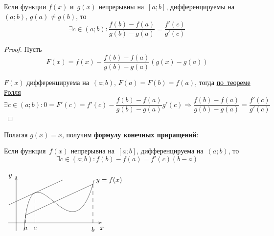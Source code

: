\begin{theorem}
\label{th:Cauchy's_mean_value}
Если функции $f(x)$ и~$g(x)$ непрерывны на~$[a; b]$, дифференцируемы на~$(a; b)$, $g(a) \neq g(b)$, то
\begin{equation*}
\exists c \in (a; b) \colon \frac{f(b) - f(a)}{g(b) - g(a)} = \frac{f'(c)}{g'(c)}
\end{equation*}
\end{theorem}
\begin{proof}
Пусть
\begin{equation*}
F(x) = f(x) - \frac{f(b) - f(a)}{g(b) - g(a)}(g(x) - g(a))
\end{equation*}

$F(x)$ дифференцируема на~$(a; b)$, $F(a) = F(b) = f(a)$, тогда \hyperref[th:Rolle's]{по~теореме Ролля}
\begin{equation*}
\exists c \in (a; b) \colon 0 = F'(c) = f'(c) - \frac{f(b) - f(a)}{g(b) - g(a)} g'(c) \Rightarrow
\frac{f(b) - f(a)}{g(b) - g(a)} = \frac{f'(c)}{g'(c)}
\end{equation*}
\end{proof}

Полагая $g(x) = x$, получим \textbf{формулу конечных приращений}:
\begin{theorem}
\label{th:mean_value}
Если функция~$f(x)$ непрерывна на~$[a; b]$, дифференцируема на~$(a; b)$, то
\begin{equation*}
\exists c \in (a; b) \colon f(b) - f(a) = f'(c)(b - a)
\end{equation*}
\end{theorem}

\begin{center}
\noindent
$\begin{xy} /r8mm/:
(-0.5, 0); (5.5, 0) **@{-} *@{>} *++!U{x};
(0, -0.5); (0, 3) **@{-} *@{>} *++!R{y};
(0.5, -0.5); (5, 2.75) **\crv{(1, 6) & (3.5, -3)} *+!L{y = f(x)};
(0.6125, 0.5) = "a"; (4.93, 2.5) = "b" **@{-};
"a"; (0.6125, 0) **@{--} *++!U{a};
"b"; (4.93, 0) **@{--} *++!U{b};
(-0.5, 1.1522); (3, 2.7735) **@{-}; %
(1.21, 1.9443); (1.21, 0) **@{--} *++!U{c};
\end{xy}$
\end{center}